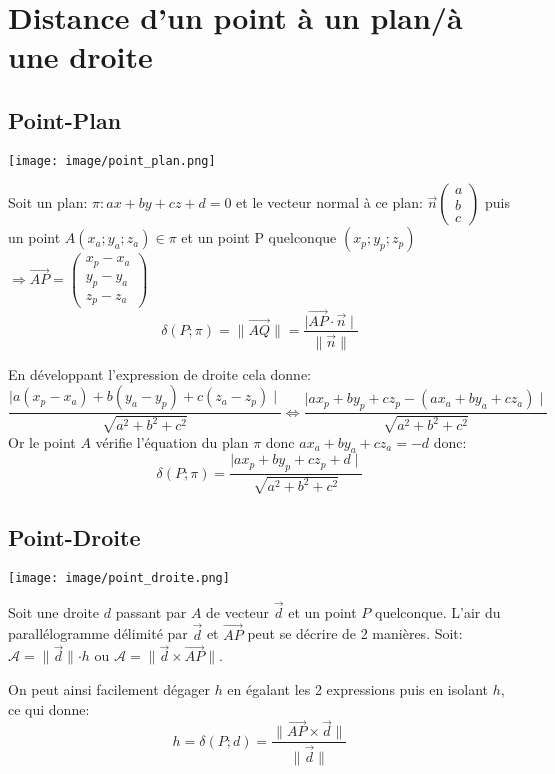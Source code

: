 \documentclass[12pt,a4paper]{report}
\begin{document}
	\chapter[Géométrie dans l'espace]{Distance d'un point à un plan/à une droite}
	\section*{Point-Plan}
	\texttt{[image: image/point\_plan.png]}
	\vspace{1cm}
	
	Soit un plan: $\pi:ax+by+cz+d=0$ et le vecteur normal à ce plan: $\overrightarrow{n}
	\left( \begin{array}{c}
	a \\
	b \\
	c
	\end{array} \right)$
	puis un point $A(x_a;y_a;z_a) \in \pi$ et un point P quelconque $(x_p;y_p;z_p)$ $\Rightarrow \overrightarrow{AP}=
	\left( \begin{array}{c}
	x_p-x_a \\
	y_p-y_a \\
	z_p-z_a
	\end{array} \right)$
	\[  \delta(P;\pi) = \parallel \overrightarrow{AQ} \parallel =\dfrac{\mid \overrightarrow{AP}\cdot\overrightarrow{n} \mid}{\parallel\overrightarrow{n}\parallel}  \]
	
	En développant l'expression de droite cela donne: \[ \dfrac{\mid a(x_p-x_a)+b(y_a-y_p)+c(z_a-z_p) \mid}{\sqrt{a^2+b^2+c^2}} \Leftrightarrow  \dfrac{\mid ax_p+by_p +cz_p -(ax_a+by_a+cz_a) \mid}{\sqrt{a^2+b^2+c^2}}   \]
	Or le point $A$ vérifie l'équation du plan $\pi$ donc $ax_a+by_a+cz_a = -d$ donc: \[ \delta(P;\pi)=\dfrac{\mid ax_p+by_p +cz_p+d \mid}{\sqrt{a^2+b^2+c^2}} \]
	
	\section*{Point-Droite}
	
	\texttt{[image: image/point\_droite.png]}
	\vspace{1cm}
	
	Soit une droite $d$ passant par $A$ de vecteur $\overrightarrow{d}$ et un point $P$ quelconque. L'air du parallélogramme délimité par $\overrightarrow{d}$ et $\overrightarrow{AP}$ peut se décrire de 2 manières. Soit: $\mathcal{A}=\parallel \overrightarrow{d}\parallel\cdot h$ ou $\mathcal{A}=\parallel \overrightarrow{d}\times\overrightarrow{AP}\parallel$.
	
	On peut ainsi facilement dégager $h$ en égalant les 2 expressions puis en isolant $h$, ce qui donne: \[ h=\delta(P;d)=\dfrac{\parallel \overrightarrow{AP}\times\overrightarrow{d}\parallel}{\parallel\overrightarrow{d}\parallel} \]
\end{document}
